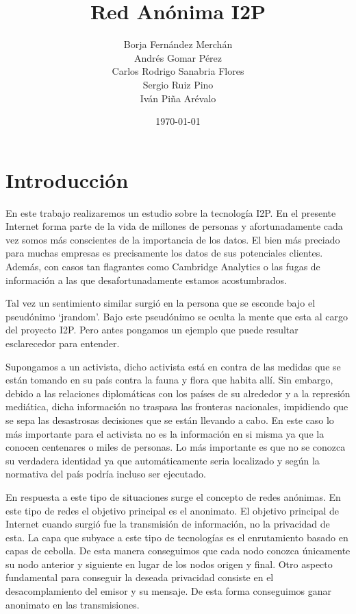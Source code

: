 \documentclass{article}
\title{Red Anónima I2P}
\author{Borja Fernández Merchán \\ Andrés Gomar Pérez \\ Carlos Rodrigo Sanabria Flores \\ Sergio Ruiz Pino
 \\ Iván Piña Arévalo}
\date{\today}
\begin{document}
\maketitle

\section{Introducción}
En este trabajo realizaremos un estudio sobre la tecnología I2P. En el presente Internet forma parte de la vida 
de millones de personas y afortunadamente cada vez somos más conscientes de la importancia de los datos. El bien 
más preciado para muchas empresas es precisamente los datos de sus potenciales clientes. Además, con casos tan 
flagrantes como Cambridge Analytics o las fugas de información a las que desafortunadamente estamos acostumbrados. 

Tal vez un sentimiento similar surgió en la persona que se esconde bajo el pseudónimo ‘jrandom’. Bajo este 
pseudónimo se oculta la mente que esta al cargo del proyecto I2P. Pero antes pongamos un ejemplo que puede resultar 
esclarecedor para entender.

Supongamos a un activista, dicho activista está en contra de las medidas que se están tomando en su país contra 
la fauna y flora que habita allí. Sin embargo, debido a las relaciones diplomáticas con los países de su alrededor
y a la represión mediática, dicha información no traspasa las fronteras nacionales, impidiendo que se sepa las desastrosas 
decisiones que se están llevando a cabo. En este caso lo más importante para el activista no es la información en si misma 
ya que la conocen centenares o miles de personas. Lo más importante es que no se conozca su verdadera identidad ya que 
automáticamente seria localizado y según la normativa del país podría incluso ser ejecutado. 

En respuesta a este tipo de situaciones surge el concepto de redes anónimas. En este tipo de redes el objetivo principal es 
el anonimato. El objetivo principal de Internet cuando surgió fue la transmisión de información, no la privacidad de esta. La 
capa que subyace a este tipo de tecnologías es el enrutamiento basado en capas de cebolla. De esta manera conseguimos que cada 
nodo conozca únicamente su nodo anterior y siguiente en lugar de los nodos origen y final. Otro aspecto fundamental para conseguir 
la deseada privacidad consiste en el desacomplamiento del emisor y su mensaje. De esta forma conseguimos ganar anonimato en las 
transmisiones. 
\end{document}
